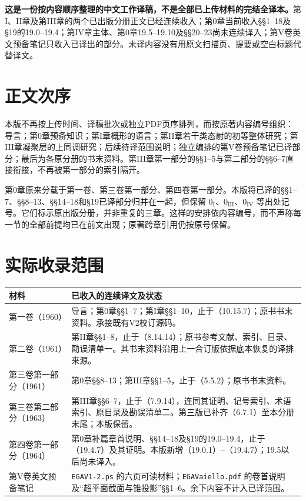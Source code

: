 \maketitle
{}
\noindent\textbf{这是一份按内容顺序整理的中文工作译稿，不是全部已上传材料的完结全译本。}第I、II章及第III章的两个已出版分册正文已经连续收入；第0章当前收入§§1--18及§19的19.0--19.4；第IV章主体、第0章19.5--19.10及§§20--23尚未连续译入；第V卷英文预备笔记只收入已译出的部分。未译内容没有用原文扫描页、提要或空白标题代替译文。

\section*{正文次序}
本版不再按上传时间、译稿批次或独立PDF页序排列，而按原著内容编号组织：导言；第0章预备知识；第I章概形的语言；第II章若干类态射的初等整体研究；第III章凝聚层的上同调研究；后续待译范围说明；独立编排的第V卷预备笔记已译部分；最后为各原分册的书末资料。第III章第一部分的§§1--5与第二部分的§§6--7直接衔接，不再被第一部分的索引隔开。

第0章原来分载于第一卷、第三卷第一部分、第四卷第一部分。本版将已译的§§1--7、§§8--13、§§14--18和§19已译部分归并在一起，但保留 $0_{\mathrm I}$、$0_{\mathrm{III}}$、$0_{\mathrm{IV}}$ 等出处记号。它们标示原出版分册，并非重复的三章。这样的安排依内容编号，而不声称每一节的全部前提均已在前文出现；原著跨章引用仍按原号保留。

\section*{实际收录范围}
\begin{longtable}{@{}p{.25\linewidth}p{.67\linewidth}@{}}
\toprule 材料 & 已收入的连续译文及状态\\\midrule\endhead
第一卷（1960） & 导言；第0章§§1--7；第I章§§1--10，止于（10.15.7）；原书书末资料。承接既有V2校订源码。\\
第二卷（1961） & 第II章§§1--8，止于（8.14.14）；原书参考文献、索引、目录、勘误清单一。其书末资料沿用上一合订版依据底本恢复的译排来源。\\
第三卷第一部分（1961） & 第0章§§8--13；第III章§§1--5，止于（5.5.2）；原书书末资料。\\
第三卷第二部分（1963） & 第III章§§6--7，止于（7.9.14），连同其证明、记号索引、术语索引、原目录及勘误清单二。第三版已补齐（6.7.1）至本分册末尾；本版保留。\\
第四卷第一部分（1964） & 第0章补篇章首说明、§§14--18及§19的19.0--19.4，止于（19.4.7）及其证明。本版新增（19.0.1）--（19.4.7）；19.5以后尚未译入。\\
第V卷英文预备笔记 & \texttt{EGAV1-2.ps} 的六页可读材料；\texttt{EGAVaiello.pdf} 的卷首说明及“超平面截面与锥投影”§§1--6。余下内容不计入已译范围。\\
\bottomrule
\end{longtable}

